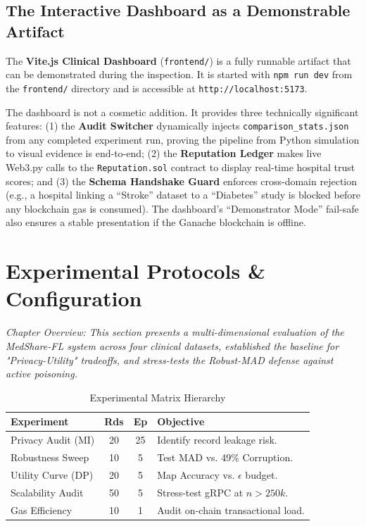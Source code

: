 \documentclass[10pt, a4paper, twocolumn]{article}
\begin{document}
\subsection{The Interactive Dashboard as a Demonstrable Artifact}
The \textbf{Vite.js Clinical Dashboard} (\texttt{frontend/}) is a fully runnable artifact that can be demonstrated during the inspection. It is started with \texttt{npm run dev} from the \texttt{frontend/} directory and is accessible at \texttt{http://localhost:5173}.

The dashboard is not a cosmetic addition. It provides three technically significant features: (1) the \textbf{Audit Switcher} dynamically injects \texttt{comparison\_stats.json} from any completed experiment run, proving the pipeline from Python simulation to visual evidence is end-to-end; (2) the \textbf{Reputation Ledger} makes live Web3.py calls to the \texttt{Reputation.sol} contract to display real-time hospital trust scores; and (3) the \textbf{Schema Handshake Guard} enforces cross-domain rejection (e.g., a hospital linking a ``Stroke'' dataset to a ``Diabetes'' study is blocked before any blockchain gas is consumed). The dashboard's ``Demonstrator Mode'' fail-safe also ensures a stable presentation if the Ganache blockchain is offline.

\section{Experimental Protocols \& Configuration}

\textit{Chapter Overview: This section presents a multi-dimensional evaluation of the MedShare-FL system across four clinical datasets, established the baseline for "Privacy-Utility" tradeoffs, and stress-tests the Robust-MAD defense against active poisoning.}

\begin{table}[hbt!]
\centering
\scriptsize
\begin{tabular}{lccl}
\toprule
\textbf{Experiment} & \textbf{Rds} & \textbf{Ep} & \textbf{Objective} \\
\midrule
Privacy Audit (MI) & 20 & 25 & Identify record leakage risk. \\
Robustness Sweep & 10 & 5 & Test MAD vs. 49\% Corruption. \\
Utility Curve (DP) & 20 & 5 & Map Accuracy vs. $\epsilon$ budget. \\
Scalability Audit & 50 & 5 & Stress-test gRPC at $n > 250k$. \\
Gas Efficiency & 10 & 1 & Audit on-chain transactional load. \\
\bottomrule
\end{tabular}
\caption{Experimental Matrix Hierarchy}
\end{table}
\end{document}
